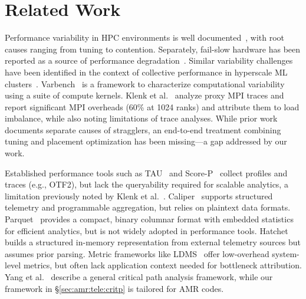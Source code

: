 
\section{Related Work}
\label{sec:amr:relwork}


Performance variability in HPC environments is well documented~\cite{Petri2003:Missing,
  Hoefl2012:OptimizationPrinciplesCollective,Yildi2016:IONoise,Acun2016:Variation,VanS2009:AMR}, with
root causes ranging from tuning to contention.
Separately, fail-slow hardware has been reported as a source of performance
degradation~\cite{Gunaw2018:FailSlow,Lu2023:PERSEUS}.
Similar variability challenges have been identified in the context of collective performance in
hyperscale ML clusters~\cite{Gangi2024:RDMA}.
Varbench~\cite{Kocol2018:Varbench} is a framework to characterize computational variability using a
suite of compute kernels.
Klenk et al.~\cite{Klenk2017:OverviewMPICharacteristics} analyze proxy MPI traces and report
significant MPI overheads (60\% at 1024 ranks) and attribute them to load imbalance, while also
noting limitations of trace analyses.
While prior work documents separate causes of stragglers, an end-to-end treatment combining tuning
and placement optimization has been missing---a gap addressed by our work.

Established performance tools such as TAU~\cite{Shend2006:TAU} and Score-P~\cite{Mey2012:Score-P}
collect profiles and traces (e.g., OTF2), but lack the queryability required for scalable
analytics, a limitation previously noted by Klenk et
al.~\cite{Klenk2017:OverviewMPICharacteristics}.
Caliper~\cite{Boehm2016:Caliper} supports structured telemetry and programmable aggregation, but
relies on plaintext data formats.
Parquet~\cite{:ApacheParquet} provides a compact, binary columnar format with embedded statistics
for efficient analytics, but is not widely adopted in performance tools.
Hatchet~\cite{Bhate2019:Hatchet} builds a structured in-memory representation from external
telemetry sources but assumes prior parsing.
Metric frameworks like LDMS~\cite{Schwa2021:LDMS} offer low-overhead system-level metrics, but
often lack application context needed for bottleneck attribution.
Yang et al.~\cite{Yang1988:CriticalPath} describe a general critical path analysis framework, while
our framework in \S\ref{sec:amr:tele:critp} is tailored for AMR codes.

